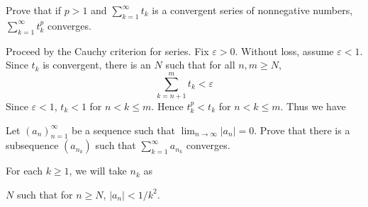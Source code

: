 \documentclass[../main.tex]{subfiles}
\begin{document}
\begin{problem}[\S3.1 C]
    Prove that if $p > 1$ and $\sum_{k = 1}^\infty t_k$ is a convergent series of nonnegative numbers, $\sum_{k = 1}^\infty t_k^p$ converges.
\end{problem}
Proceed by the Cauchy criterion for series.
Fix $\varepsilon > 0$.
Without loss, assume $\varepsilon < 1$.
Since $t_k$ is convergent, there is an $N$ such that for all $n, m \ge N$,
\[
    \sum_{k = n + 1}^m t_k < \varepsilon
\]
Since $\varepsilon < 1$, $t_k < 1$ for $n < k \le m$.
Hence $t_k^p < t_k$ for $n < k \le m$.
Thus we have

\begin{problem}[\S 3.1 D]
    Let $(a_n)_{n = 1}^\infty$ be a sequence such that $\lim_{n \to \infty} |a_n| = 0$.
    Prove that there is a subsequence $(a_{n_k})$ such that $\sum_{k = 1}^\infty a_{n_k}$ converges.
\end{problem}
For each $k \ge 1$, we will take $n_k$ as 

$N$ such that for $n \ge N$, $|a_{n}| < 1/k^2$.
\end{document}
